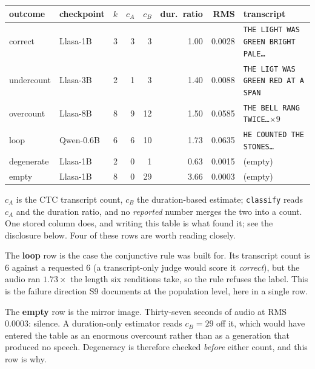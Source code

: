 \documentclass[11pt]{article}
\begin{document}
\begin{center}
{\footnotesize
\begin{tabular}{@{}llrrrrrl@{}}
\toprule
outcome & checkpoint & $k$ & $c_A$ & $c_B$ & dur.\ ratio & RMS & transcript \\
\midrule
correct    & Llasa-1B & 3 & 3 & 3  & 1.00 & 0.0028 & \texttt{THE LIGHT WAS GREEN BRIGHT PALE\ldots} \\
undercount & Llasa-3B & 2 & 1 & 3  & 1.40 & 0.0088 & \texttt{THE LIGT WAS GREEN RED AT A SPAN} \\
overcount  & Llasa-8B & 8 & 9 & 12 & 1.50 & 0.0585 & \texttt{THE BELL RANG TWICE\ldots}$\times 9$ \\
loop       & Qwen-0.6B & 6 & 6 & 10 & 1.73 & 0.0635 & \texttt{HE COUNTED THE STONES\ldots} \\
degenerate & Llasa-1B & 2 & 0 & 1  & 0.63 & 0.0015 & (empty) \\
empty      & Llasa-1B & 8 & 0 & 29 & 3.66 & 0.0003 & (empty) \\
\bottomrule
\end{tabular}}
\end{center}

\noindent $c_A$ is the CTC transcript count, $c_B$ the duration-based estimate;
\texttt{classify} reads $c_A$ and the duration ratio, and no \emph{reported}
number merges the two into a count. One stored column does, and writing this
table is what found it; see the disclosure below. Four of these rows are
worth reading closely.

The \textbf{loop} row is the case the conjunctive rule was built for. Its
transcript count is $6$ against a requested $6$ (a transcript-only judge
would score it \emph{correct}), but the audio ran $1.73\times$ the length six
renditions take, so the rule refuses the label. This is the failure direction
S9 documents at the population level, here in a single row.

The \textbf{empty} row is the mirror image. Thirty-seven seconds of audio at RMS
$0.0003$: silence. A duration-only estimator reads $c_B{=}29$ off it, which
would have entered the table as an enormous overcount rather than as a
generation that produced no speech. Degeneracy is therefore checked \emph{before}
either count, and this row is why.
\end{document}
